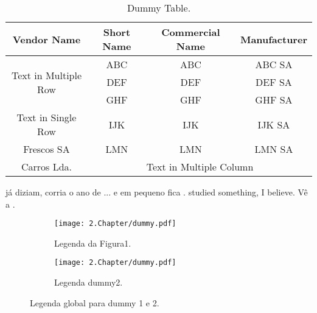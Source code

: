 \begin{table}[H]
	\centering
	\caption{Dummy Table.}
	\begin{tabular}{|c|c|c|c|} \hline
		\textbf{Vendor Name} 				& \textbf{Short Name}	& \textbf{Commercial Name}	& \textbf{Manufacturer}	\\ \hline \hline
		\multirow{3}{*}{Text in Multiple Row}		&	ABC				&  ABC\textreg				& ABC SA			         \\ \cline{2-4}
		 								&        DEF				&  DEF\textreg				& DEF SA				\\ \cline{2-4}
										&        GHF			&  GHF\textreg				& GHF SA				\\ \hline
		Text in Single Row					&        IJK				& IJK\textreg				& IJK SA				\\ \hline
		Frescos SA						&        LMN			& LMN\textreg				& LMN SA				\\ \hline
		Carros Lda.						&    \multicolumn{3}{|c|}{Text in Multiple Column}							\\ \hline
	\end{tabular}
	\label{tab:dummytable}
\end{table}

\citet{history} já diziam, corria o ano de \citeyear{history}...
e em pequeno fica .
\citet{label2} studied something, I believe.
Vê a .

\begin{figure}[htbp]
  \centering
  \begin{subfigure}[t]{0.4\textwidth}
        \texttt{[image: 2.Chapter/dummy.pdf]}
        \caption{Legenda da Figura1.}
        \label{fig:dummy1}
  \end{subfigure}
  \begin{subfigure}[t]{0.5\textwidth} %
  \centering\captionsetup{width=.9\linewidth}
        \texttt{[image: 2.Chapter/dummy.pdf]} 
        \caption{Legenda dummy2.}
        \label{fig:dummy2}
  \end{subfigure}
  \caption[Figs dummy1 e 2]{Legenda global para dummy 1 e 2.}
  \label{fig:dummy-geral}
\end{figure}
